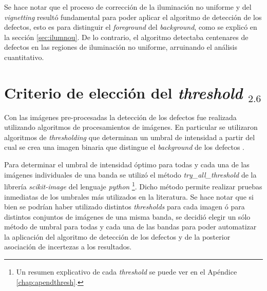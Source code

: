 Se hace notar que el proceso de corrección de la iluminación no uniforme y del \textit{vignetting} resultó fundamental para poder aplicar el algoritmo de detección de los defectos, esto es para distinguir el \textit{foreground} del \textit{background}, como se explicó en la sección \ref{sec:ilumnou}. De lo contrario, el algoritmo detectaba centenares de defectos en las regiones de iluminación no uniforme, arruinando el análisis cuantitativo.

\singlespacing
\section{Criterio de elección del \textit{threshold} \href{https://github.com/jrr1984/defects_analysis/blob/master/try_all_thresholds.py}{\faGithub$_{2.6}$}}
\label{sec:tthresh}

\hspace{0.5cm}Con las imágenes pre-procesadas la detección de los defectos fue realizada utilizando algoritmos de procesamientos de imágenes. En particular se utilizaron algoritmos de \textit{thresholding} que determinan un umbral de intensidad a partir del cual se crea una imagen binaria que distingue el \textit{background} de los defectos \cite{shapi}.

Para determinar el umbral de intensidad óptimo para todas y cada una de las imágenes individuales de una banda se utilizó el método \textit{try\_all\_threshold} de la librería \textit{scikit-image} del lenguaje \textit{python} \cite{van2014scikit} \footnote{Un resumen explicativo de cada \textit{threshold} se puede ver en el Apéndice \ref{chap:apendthresh}.}. Dicho método permite realizar pruebas inmediatas de los umbrales más utilizados en la literatura. Se hace notar que si bien se podrían haber utilizado distintos \textit{thresholds} para cada imagen ó para distintos conjuntos de imágenes de una misma banda, se decidió elegir un sólo método de umbral para todas y cada una de las bandas para poder automatizar la aplicación del algoritmo de detección de los defectos y de la posterior asociación de incertezas a los resultados.


